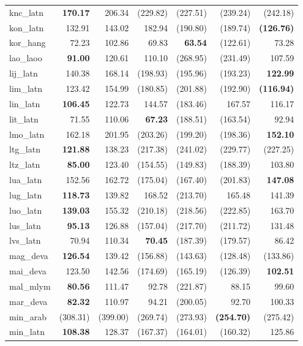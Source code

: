 \documentclass[11pt]{article}
\begin{document}
\begin{center}
\begin{longtable}[width=0.9\textwidth]{|l|rrrrrr|}
knc\_latn & \textbf{170.17} & 206.34 & (229.82) & (227.51) & (239.24) & (242.18) \\ 
kon\_latn & 132.91 & 143.02 & 182.94 & (190.80) & (189.74) & \textbf{(126.76)} \\ 
kor\_hang & 72.23 & 102.86 & 69.83 & \textbf{63.54} & (122.61) & 73.28 \\ 
lao\_laoo & \textbf{91.00} & 120.61 & 110.10 & (268.95) & (231.49) & 107.59 \\ 
lij\_latn & 140.38 & 168.14 & (198.93) & (195.96) & (193.23) & \textbf{122.99} \\ 
lim\_latn & 123.42 & 154.99 & (180.85) & (201.88) & (192.90) & \textbf{(116.94)} \\ 
lin\_latn & \textbf{106.45} & 122.73 & 144.57 & (183.46) & 167.57 & 116.17 \\ 
lit\_latn & 71.55 & 110.06 & \textbf{67.23} & (188.51) & (163.54) & 92.94 \\ 
lmo\_latn & 162.18 & 201.95 & (203.26) & (199.20) & (198.36) & \textbf{152.10} \\ 
ltg\_latn & \textbf{121.88} & 138.23 & (217.38) & (241.02) & (229.77) & (227.25) \\ 
ltz\_latn & \textbf{85.00} & 123.40 & (154.55) & (149.83) & (188.39) & 103.80 \\ 
lua\_latn & 152.56 & 162.72 & (175.04) & (167.40) & (201.83) & \textbf{147.08} \\ 
lug\_latn & \textbf{118.73} & 139.82 & 168.52 & (213.70) & 165.48 & 141.39 \\ 
luo\_latn & \textbf{139.03} & 155.32 & (210.18) & (218.56) & (222.85) & 163.70 \\ 
lus\_latn & \textbf{95.13} & 126.88 & (157.04) & (217.70) & (211.72) & 131.48 \\ 
lvs\_latn & 70.94 & 110.34 & \textbf{70.45} & (187.39) & (179.57) & 86.42 \\ 
mag\_deva & \textbf{126.54} & 139.42 & (156.88) & (143.63) & (128.48) & (133.86) \\ 
mai\_deva & 123.50 & 142.56 & (174.69) & (165.19) & (126.39) & \textbf{102.51} \\ 
mal\_mlym & \textbf{80.56} & 111.47 & 92.78 & (221.87) & 88.15 & 99.60 \\ 
mar\_deva & \textbf{82.32} & 110.97 & 94.21 & (200.05) & 92.70 & 100.33 \\ 
min\_arab & (308.31) & (399.00) & (269.74) & (273.93) & \textbf{(254.70)} & (275.42) \\ 
min\_latn & \textbf{108.38} & 128.37 & (167.37) & (164.01) & (160.32) & 125.86 \\ 

\end{longtable}
\end{center}
\end{document}
